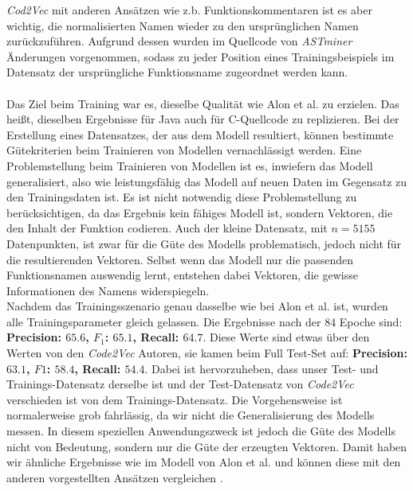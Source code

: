 \documentclass[12pt,letterpaper,ngerman]{article}
\begin{document}
\textit{Cod2Vec} mit anderen Ansätzen wie z.b. Funktionskommentaren ist
es aber wichtig,
die normalisierten Namen wieder zu den ursprünglichen Namen zurückzuführen.
Aufgrund dessen wurden im Quellcode von \textit{ASTminer} Änderungen
vorgenommen, sodass zu jeder Position eines Trainingsbeispiels im 
Datensatz der ursprüngliche Funktionsname zugeordnet werden kann. \\
\pagebreak
\hfill\\
Das Ziel beim Training war es, dieselbe Qualität wie Alon et al. zu erzielen. 
Das heißt, dieselben Ergebnisse für Java auch für C-Quellcode zu 
replizieren. Bei der Erstellung eines Datensatzes, der aus dem 
Modell resultiert, können bestimmte Gütekriterien beim Trainieren 
von Modellen vernachlässigt werden. Eine Problemstellung beim 
Trainieren von Modellen ist es, inwiefern das Modell generalisiert, 
also wie leistungsfähig das Modell auf neuen Daten im Gegensatz zu 
den Trainingsdaten ist.
Es ist nicht notwendig diese Problemstellung zu berücksichtigen,
da das 
Ergebnis kein fähiges Modell ist, sondern Vektoren, die den 
Inhalt der Funktion codieren.
Auch der kleine Datensatz, mit $n = 5155 $ Datenpunkten, ist zwar
für die Güte des Modells problematisch, jedoch nicht für die
resultierenden Vektoren. Selbst wenn das Modell nur 
die passenden Funktionsnamen auswendig lernt, entstehen dabei
Vektoren, die gewisse Informationen des Namens widerspiegeln.\\
Nachdem das Trainingsszenario 
genau dasselbe wie bei Alon et al. ist, wurden alle
Trainingsparameter gleich 
gelassen. Die Ergebnisse nach der 84 Epoche sind: 
{\bf Precision: $65.6$, $F_1$: $65.1$,  Recall: $64.7$}. Diese Werte sind 
etwas über den Werten von den \textit{Code2Vec} Autoren, sie kamen beim 
Full Test-Set auf: {\bf Precision: $63.1$, $F1$: $58.4$,  Recall: $54.4$}. 
Dabei ist hervorzuheben, dass unser Test- und Trainings-Datensatz derselbe ist
und der Test-Datensatz von \textit{Code2Vec} verschieden ist von dem 
Trainings-Datensatz. Die Vorgehensweise ist normalerweise grob fahrlässig,
da wir nicht die Generalisierung des Modells messen. In diesem speziellen 
Anwendungszweck ist jedoch die Güte des Modells nicht von Bedeutung,
sondern nur die Güte der erzeugten Vektoren.
Damit haben wir ähnliche Ergebnisse wie im Modell von Alon et al.
und können diese mit den anderen vorgestellten Ansätzen vergleichen
\cite{code2vec}.
\end{document}
